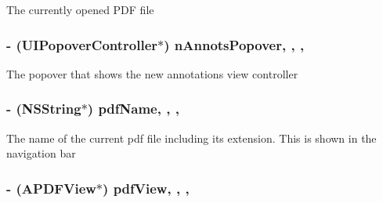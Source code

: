 The currently opened P\-D\-F file \hypertarget{interface_a_p_d_f_detail_view_controller_a332bcd4a064cfa95fc63527f3d5d474e}{
\subsubsection[{n\-Annots\-Popover}]{\setlength{\rightskip}{0pt plus 5cm}-\/ (U\-I\-Popover\-Controller$\ast$) n\-Annots\-Popover\hspace{0.3cm}{\ttfamily [read]}, {\ttfamily [write]}, {\ttfamily [nonatomic]}, {\ttfamily [retain]}}}\label{interface_a_p_d_f_detail_view_controller_a332bcd4a064cfa95fc63527f3d5d474e}
The popover that shows the new annotations view controller \hypertarget{interface_a_p_d_f_detail_view_controller_aa63fcfba604fa748fa5127694451a916}{
\subsubsection[{pdf\-Name}]{\setlength{\rightskip}{0pt plus 5cm}-\/ (N\-S\-String$\ast$) pdf\-Name\hspace{0.3cm}{\ttfamily [read]}, {\ttfamily [write]}, {\ttfamily [nonatomic]}, {\ttfamily [retain]}}}\label{interface_a_p_d_f_detail_view_controller_aa63fcfba604fa748fa5127694451a916}
The name of the current pdf file including its extension. This is shown in the navigation bar \hypertarget{interface_a_p_d_f_detail_view_controller_aaf490f765a72dd330a26ec4f486bfba1}{
\subsubsection[{pdf\-View}]{\setlength{\rightskip}{0pt plus 5cm}-\/ ({\bf A\-P\-D\-F\-View}$\ast$) pdf\-View\hspace{0.3cm}{\ttfamily [read]}, {\ttfamily [write]}, {\ttfamily [nonatomic]}, {\ttfamily [retain]}}}\label{interface_a_p_d_f_detail_view_controller_aaf490f765a72dd330a26ec4f486bfba1}
